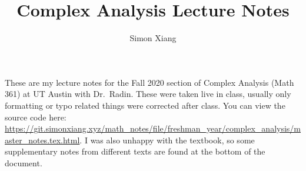 \documentclass[fontsize=9pt]{scrartcl}
\date{}
\author{Simon Xiang}
\title{Complex Analysis Lecture Notes}
\begin{document}
\maketitle
These are my lecture notes for the Fall 2020 section of Complex Analysis (Math 361) at UT Austin with Dr.\ Radin. These were taken live in class, usually only formatting or typo related things were corrected after class. You can view the source code here: \url{https://git.simonxiang.xyz/math_notes/file/freshman_year/complex_analysis/master_notes.tex.html}.
I was also unhappy with the textbook, so some supplementary notes from different texts are found at the bottom of the document.
\tableofcontents
    
    
    
    
    
    
    
    
    
    
    
    
    
    
    
    
    
\end{document}
